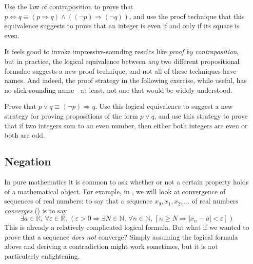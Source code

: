 \begin{exercise}
Use the law of contraposition to prove that $p \Leftrightarrow q \equiv (p \Rightarrow q) \wedge ((\neg p) \Rightarrow (\neg q))$, and use the proof technique that this equivalence suggests to prove that an integer is even if and only if its square is even.
\end{exercise}

It feels good to invoke impressive-sounding results like \textit{proof by contraposition}, but in practice, the logical equivalence between \textit{any} two different propositional formulae suggests a new proof technique, and not all of these techniques have names. And indeed, the proof strategy in the following exercise, while useful, has no slick-sounding name---at least, not one that would be widely understood.

\begin{exercise}
Prove that $p \vee q \equiv (\neg p) \Rightarrow q$. Use this logical equivalence to suggest a new strategy for proving propositions of the form $p \vee q$, and use this strategy to prove that if two integers sum to an even number, then either both integers are even or both are odd.
\end{exercise}

\subsection*{Negation}

In pure mathematics it is common to ask whether or not a certain property holds of a mathematical object. For example, in , we will look at convergence of sequences of real numbers: to say that a sequence $x_0,x_1,x_2,\dots$ of real numbers \textit{converges}\label{pConvergencePreliminary} () is to say
\[ \exists a \in \mathbb{R},\, \forall \varepsilon \in \mathbb{R},\, (\varepsilon > 0 \Rightarrow \exists N \in \mathbb{N},\, \forall n \in \mathbb{N},\, [n \ge N \Rightarrow |x_n-a| < \varepsilon])\]
This is already a relatively complicated logical formula. But what if we wanted to prove that a sequence \textit{does not} converge? Simply assuming the logical formula above and deriving a contradiction might work sometimes, but it is not particularly enlightening.

